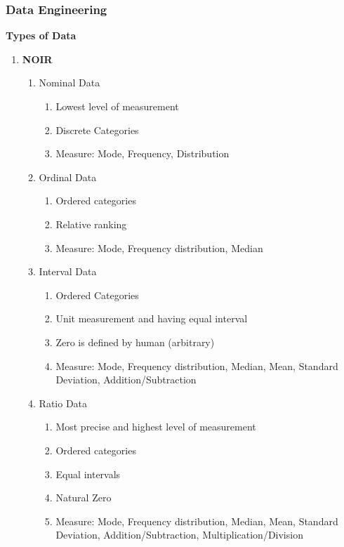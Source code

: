 \documentclass{article}
\begin{document}
\subsubsection{Data Engineering}
\textbf{Types of Data}
\begin{enumerate}
    \item \textbf{NOIR}
    \begin{enumerate}
        \item Nominal Data
        \begin{enumerate}
            \item Lowest level of measurement
            \item Discrete Categories
            \item Measure: Mode, Frequency, Distribution
        \end{enumerate}
        \item Ordinal Data
        \begin{enumerate}
            \item Ordered categories
            \item Relative ranking
            \item Measure: Mode, Frequency distribution, Median
        \end{enumerate}
        \item Interval Data
        \begin{enumerate}
            \item Ordered Categories
            \item Unit measurement and having equal interval
            \item Zero is defined by human (arbitrary)
            \item Measure: Mode, Frequency distribution, Median, Mean, Standard Deviation, Addition/Subtraction
        \end{enumerate}
        \item Ratio Data
        \begin{enumerate}
            \item Most precise and highest level of measurement
            \item Ordered categories
            \item Equal intervals
            \item Natural Zero
            \item Measure: Mode, Frequency distribution, Median, Mean, Standard Deviation, Addition/Subtraction, Multiplication/Division
        \end{enumerate}

\end{enumerate}
\end{enumerate}
\end{document}
